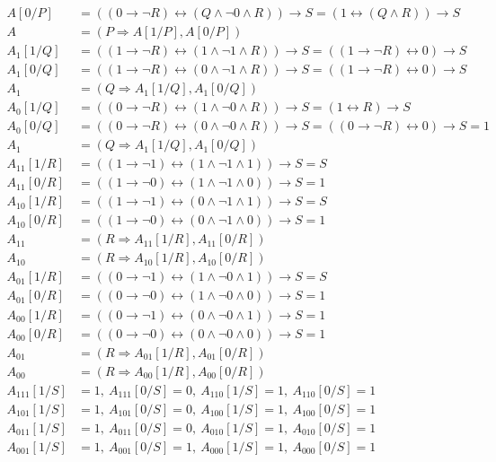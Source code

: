 \documentclass[a4paper,12pt]{article}
\begin{document}
\begin{enumerate}
\begin{align*}
		A[0/P]&=((0\to\neg R)\leftrightarrow(Q\land\neg 0\land R))\to S=(1\leftrightarrow(Q\land R))\to S\\
		A&=(P\Rightarrow A[1/P], A[0/P])\\
		A_{1}[1/Q]&=((1\to\neg R)\leftrightarrow(1\land\neg 1\land R))\to S=((1\to\neg R)\leftrightarrow0)\to S\\
		A_{1}[0/Q]&=((1\to\neg R)\leftrightarrow(0\land\neg 1\land R))\to S=((1\to\neg R)\leftrightarrow 0)\to S\\
		A_1&=(Q\Rightarrow A_1[1/Q], A_1[0/Q])\\
		A_{0}[1/Q]&=((0\to\neg R)\leftrightarrow(1\land\neg 0\land R))\to S=(1\leftrightarrow R)\to S \\
		A_{0}[0/Q]&=((0\to\neg R)\leftrightarrow(0\land\neg 0\land R))\to S=((0\to\neg R)\leftrightarrow0)\to S=1\\
		A_1&=(Q\Rightarrow A_1[1/Q], A_1[0/Q])\\
		A_{11}[1/R]&=((1\to\neg 1)\leftrightarrow(1\land\neg 1\land 1))\to S=S\\
		A_{11}[0/R]&=((1\to\neg 0)\leftrightarrow(1\land\neg 1\land 0))\to S=1\\
		A_{10}[1/R]&=((1\to\neg 1)\leftrightarrow(0\land\neg 1\land 1))\to S=S\\
		A_{10}[0/R]&=((1\to\neg 0)\leftrightarrow(0\land\neg 1\land 0))\to S=1\\
		A_{11}&=(R\Rightarrow A_{11}[1/R], A_{11}[0/R])\\
		A_{10}&=(R\Rightarrow A_{10}[1/R], A_{10}[0/R])\\
		A_{01}[1/R]&=((0\to\neg 1)\leftrightarrow(1\land\neg 0\land 1))\to S=S\\
		A_{01}[0/R]&=((0\to\neg 0)\leftrightarrow(1\land\neg 0\land 0))\to S=1\\
		A_{00}[1/R]&=((0\to\neg 1)\leftrightarrow(0\land\neg 0\land 1))\to S=1\\
		A_{00}[0/R]&=((0\to\neg 0)\leftrightarrow(0\land\neg 0\land 0))\to S=1\\
		A_{01}&=(R\Rightarrow A_{01}[1/R], A_{01}[0/R])\\
		A_{00}&=(R\Rightarrow A_{00}[1/R], A_{00}[0/R])\\
		A_{111}[1/S]&=1,\>A_{111}[0/S]=0,\>A_{110}[1/S]=1,\>A_{110}[0/S]=1\\
		A_{101}[1/S]&=1,\>A_{101}[0/S]=0,\>A_{100}[1/S]=1,\>A_{100}[0/S]=1\\
		A_{011}[1/S]&=1,\>A_{011}[0/S]=0,\>A_{010}[1/S]=1,\>A_{010}[0/S]=1\\
		A_{001}[1/S]&=1,\>A_{001}[0/S]=1,\>A_{000}[1/S]=1,\>A_{000}[0/S]=1

\end{align*}
\end{enumerate}
\end{document}
